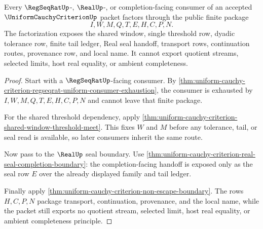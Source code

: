 \begin{theorem}
\label{thm:uniform-cauchy-criterion-real-seal-consumer-factorization}
Every $\RegSeqRatUp$-, $\RealUp$-, or completion-facing consumer of an accepted $\UniformCauchyCriterionUp$ packet factors through the public finite package
$$
I,W,M,Q,T,E,H,C,P,N.
$$
The factorization exposes the shared window, single threshold row, dyadic tolerance row, finite tail ledger, Real seal handoff, transport rows, continuation routes, provenance row, and local name. It cannot export quotient streams, selected limits, host real equality, or ambient completeness.
\end{theorem}
\begin{proof}
Start with a $\RegSeqRatUp$-facing consumer. By \autoref{thm:uniform-cauchy-criterion-regseqrat-uniform-consumer-exhaustion}, the consumer is exhausted by $I,W,M,Q,T,E,H,C,P,N$ and cannot leave that finite package.

For the shared threshold dependency, apply \autoref{thm:uniform-cauchy-criterion-shared-window-threshold-meet}. This fixes $W$ and $M$ before any tolerance, tail, or seal read is available, so later consumers inherit the same route.

Now pass to the $\RealUp$ seal boundary. Use \autoref{thm:uniform-cauchy-criterion-real-seal-completion-boundary}: the completion-facing handoff is exposed only as the seal row $E$ over the already displayed family and tail ledger.

Finally apply \autoref{thm:uniform-cauchy-criterion-non-escape-boundary}. The rows $H,C,P,N$ package transport, continuation, provenance, and the local name, while the packet still exports no quotient stream, selected limit, host real equality, or ambient completeness principle.
\end{proof}

